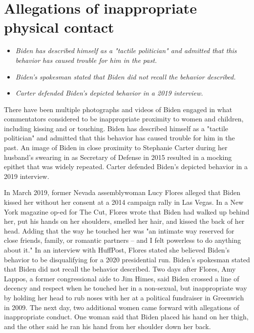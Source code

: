 \section{Allegations of inappropriate physical
contact}\label{allegations-of-inappropriate-physical-contact}

\begin{itemize}
\item
  \emph{Biden has described himself as a "tactile politician" and
  admitted that this behavior has caused trouble for him in the past.}
\item
  \emph{Biden's spokesman stated that Biden did not recall the behavior
  described.}
\item
  \emph{Carter defended Biden's depicted behavior in a 2019 interview.}
\end{itemize}

There have been multiple photographs and videos of Biden engaged in what
commentators considered to be inappropriate proximity to women and
children, including kissing and or touching. Biden has described himself
as a "tactile politician" and admitted that this behavior has caused
trouble for him in the past. An image of Biden in close proximity to
Stephanie Carter during her husband's swearing in as Secretary of
Defense in 2015 resulted in a mocking epithet that was widely repeated.
Carter defended Biden's depicted behavior in a 2019 interview.

In March 2019, former Nevada assemblywoman Lucy Flores alleged that
Biden kissed her without her consent at a 2014 campaign rally in Las
Vegas. In a New York magazine op-ed for The Cut, Flores wrote that Biden
had walked up behind her, put his hands on her shoulders, smelled her
hair, and kissed the back of her head. Adding that the way he touched
her was "an intimate way reserved for close friends, family, or romantic
partners -- and I felt powerless to do anything about it." In an
interview with HuffPost, Flores stated she believed Biden's behavior to
be disqualifying for a 2020 presidential run. Biden's spokesman stated
that Biden did not recall the behavior described. Two days after Flores,
Amy Lappos, a former congressional aide to Jim Himes, said Biden crossed
a line of decency and respect when he touched her in a non-sexual, but
inappropriate way by holding her head to rub noses with her at a
political fundraiser in Greenwich in 2009. The next day, two additional
women came forward with allegations of inappropriate conduct. One woman
said that Biden placed his hand on her thigh, and the other said he ran
his hand from her shoulder down her back.

